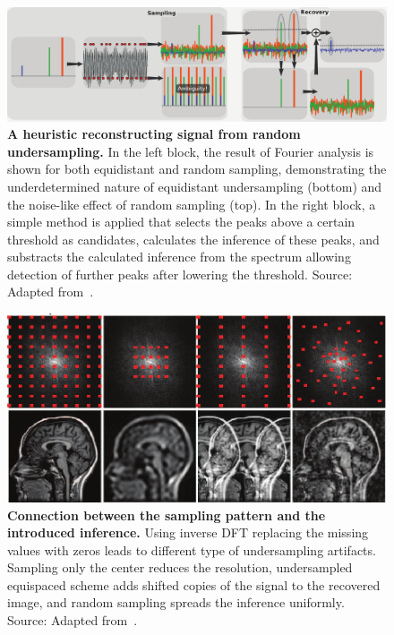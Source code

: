 \begin{figure}[htbp]
    \centering
    \includegraphics[width=0.9\linewidth]{images/random_sampling.png}
    \caption{\textbf{A heuristic reconstructing signal from random undersampling.} In the left block, the result of Fourier analysis is shown for both equidistant and random sampling, demonstrating the underdetermined nature of equidistant undersampling (bottom) and the noise-like effect of random sampling (top). In the right block, a simple method is applied that selects the peaks above a certain threshold as candidates, calculates the inference of these peaks, and substracts the calculated inference from the spectrum allowing detection of further peaks after lowering the threshold. Source: Adapted from~\cite{lustig_compressed_2008}.}
    \label{fig:random_sampling_1D}
\end{figure}

\begin{figure}[htbp]
    \centering
    \includegraphics[width=0.8\linewidth]{images/random_sampling2.png}
    \caption{\textbf{Connection between the sampling pattern and the introduced inference.} Using inverse DFT replacing the missing values with zeros leads to different type of undersampling artifacts. Sampling only the center reduces the resolution, undersampled equispaced scheme adds shifted copies of the signal to the recovered image, and random sampling spreads the inference uniformly. Source: Adapted from~\cite{lustig_compressed_2008}.}
    \label{fig:random_sampling_images}
\end{figure}

